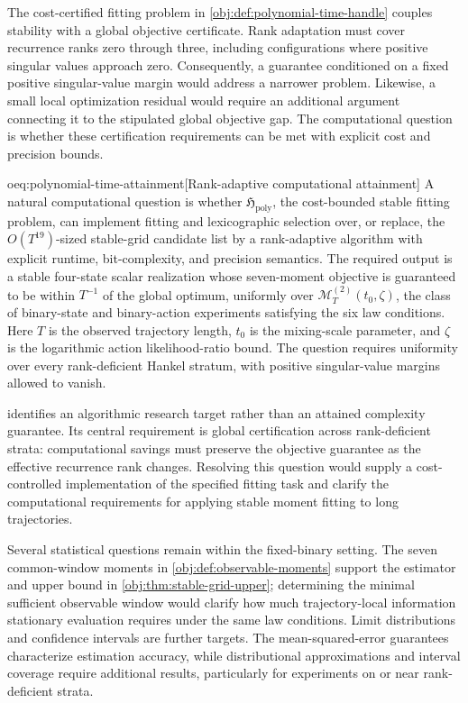\documentclass[11pt]{article}
\begin{document}
The cost-certified fitting problem  in \cref{obj:def:polynomial-time-handle} couples stability with a global objective certificate. Rank adaptation must cover recurrence ranks zero through three, including configurations where positive singular values approach zero. Consequently, a guarantee conditioned on a fixed positive singular-value margin would address a narrower problem. Likewise, a small local optimization residual would require an additional argument connecting it to the stipulated global objective gap. The computational question is whether these certification requirements can be met with explicit cost and precision bounds.

\begin{remarkv}{oeq:polynomial-time-attainment}[Rank-adaptive computational attainment]
A natural computational question is whether \(\mathfrak H_{\mathrm{poly}}\), the cost-bounded stable fitting problem, can implement fitting and lexicographic selection over, or replace, the \(O(T^{19})\)-sized stable-grid candidate list by a rank-adaptive algorithm with explicit runtime, bit-complexity, and precision semantics. The required output is a stable four-state scalar realization whose seven-moment objective is guaranteed to be within \(T^{-1}\) of the global optimum, uniformly over \(\mathcal M_T^{(2)}(t_0,\zeta)\), the class of binary-state and binary-action experiments satisfying the six law conditions. Here \(T\) is the observed trajectory length, \(t_0\) is the mixing-scale parameter, and \(\zeta\) is the logarithmic action likelihood-ratio bound. The question requires uniformity over every rank-deficient Hankel stratum, with positive singular-value margins allowed to vanish.
\end{remarkv}

 identifies an algorithmic research target rather than an attained complexity guarantee. Its central requirement is global certification across rank-deficient strata: computational savings must preserve the objective guarantee as the effective recurrence rank changes. Resolving this question would supply a cost-controlled implementation of the specified fitting task and clarify the computational requirements for applying stable moment fitting to long trajectories.

Several statistical questions remain within the fixed-binary setting. The seven common-window moments in \cref{obj:def:observable-moments} support the estimator and upper bound in \cref{obj:thm:stable-grid-upper}; determining the minimal sufficient observable window would clarify how much trajectory-local information stationary evaluation requires under the same law conditions. Limit distributions and confidence intervals are further targets. The mean-squared-error guarantees characterize estimation accuracy, while distributional approximations and interval coverage require additional results, particularly for experiments on or near rank-deficient strata.
\end{document}
